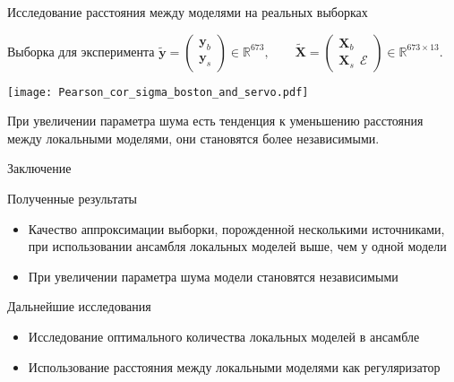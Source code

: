 \documentclass[9pt,pdf,hyperref={unicode}]{beamer}
\begin{document}
\begin{frame}{Исследование расстояния между моделями на реальных выборках}
    
    Выборка для эксперимента
$\tilde{\mathbf{y}} = \begin{pmatrix}
\mathbf{y}_b\\
\mathbf{y}_s
\end{pmatrix} \in \mathbb{R}^{673}, \qquad \tilde{\mathbf{X}} = \begin{pmatrix}
\mathbf{X}_b\\
\mathbf{X}_s ~~\mathbf{\mathcal{E}}
\end{pmatrix} \in \mathbb{R}^{673\times 13}.$

\begin{center}
\texttt{[image: Pearson\_cor\_sigma\_boston\_and\_servo.pdf]}
\end{center}
При увеличении параметра шума есть тенденция к уменьшению расстояния между локальными моделями, они становятся более независимыми. 
\end{frame}





\begin{frame}{Заключение}
    \begin{block}{Полученные результаты}
    \begin{itemize}
        \item Качество аппроксимации выборки, порожденной несколькими источниками, при использовании ансамбля локальных моделей выше, чем у одной модели
        \item При увеличении параметра шума модели становятся независимыми
    \end{itemize}
    \end{block}
    \begin{block}{Дальнейшие исследования}
    \begin{itemize}
        \item Исследование оптимального количества локальных моделей в ансамбле
        \item Использование расстояния между локальными моделями как регуляризатор 
    \end{itemize}
    \end{block}
\end{frame}
\end{document}
